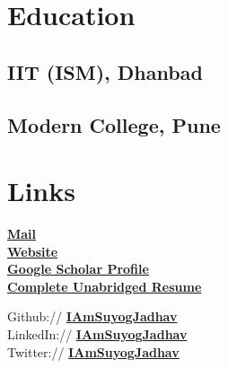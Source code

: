 \documentclass[]{deedy-resume-openfont}
\begin{document}
%
%
\lastupdated


%
%

%
%

\begin{minipage}[t]{0.28\textwidth} 


\section{Education} 

\subsection{IIT (ISM), Dhanbad}
\sectionsep

\subsection{Modern College, Pune}
\sectionsep


\section{Links} 
\href{mailto:suyog.jadhav1@gmail.com}{\bf Mail} \\
\href{http://suyogjadhav.com}{\bf Website} \\
\href{https://scholar.google.com/citations?user=8wS71BQAAAAJ&hl=en}{\bf Google Scholar Profile} \\
\href{https://www.suyogjadhav.com/resume/}{\textbf{Complete Unabridged Resume}}

\sectionsep
Github:// \href{https://github.com/IAmSuyogJadhav}{\bf IAmSuyogJadhav} \\
LinkedIn://  \href{https://www.linkedin.com/in/IAmSuyogJadhav}{\bf IAmSuyogJadhav} \\
Twitter://  \href{https://twitter.com/IAmSuyogJadhav}{\bf IAmSuyogJadhav} \\


\end{minipage}
\end{document}
